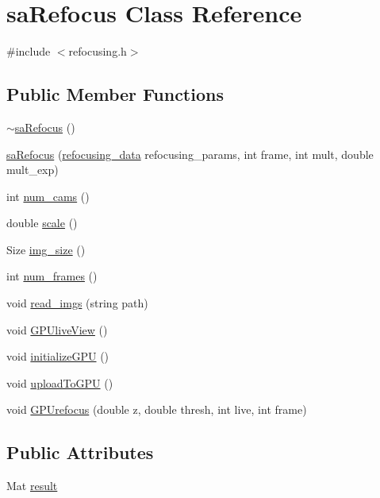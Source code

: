 \hypertarget{classsaRefocus}{\section{sa\-Refocus Class Reference}
\label{d7/d89/classsaRefocus}
}


{\ttfamily \#include $<$refocusing.\-h$>$}

\subsection*{Public Member Functions}
\begin{DoxyCompactItemize}
\item 
\hyperlink{classsaRefocus_a26ed5105f23d8a55aad8fa9a0d40730d}{$\sim$sa\-Refocus} ()
\item 
\hyperlink{classsaRefocus_a1a0ef5c34008567ce8fd5934ca66c361}{sa\-Refocus} (\hyperlink{structrefocusing__data}{refocusing\-\_\-data} refocusing\-\_\-params, int frame, int mult, double mult\-\_\-exp)
\item 
int \hyperlink{classsaRefocus_ad2fb90e82e73e5432ea36f77c4d92c63}{num\-\_\-cams} ()
\item 
double \hyperlink{classsaRefocus_acac3d21a9b434f2176c8d438ed811659}{scale} ()
\item 
Size \hyperlink{classsaRefocus_ac0256a7f546a631ae85ce90b90a2f8d9}{img\-\_\-size} ()
\item 
int \hyperlink{classsaRefocus_aea6a585af06af58407aedca16a85dda3}{num\-\_\-frames} ()
\item 
void \hyperlink{classsaRefocus_a3d75da5d4cf776ea324413f9f138ef70}{read\-\_\-imgs} (string path)
\item 
void \hyperlink{classsaRefocus_ab0d935f4b3a4201c33bf51e39e14a128}{G\-P\-Ulive\-View} ()
\item 
void \hyperlink{classsaRefocus_a2a17871cc22d0b1aed028ad6052f20b4}{initialize\-G\-P\-U} ()
\item 
void \hyperlink{classsaRefocus_a5968ccfa0a4f5d606666321ea68198e2}{upload\-To\-G\-P\-U} ()
\item 
void \hyperlink{classsaRefocus_a2aa40c035a83b39062cd0421eb200512}{G\-P\-Urefocus} (double z, double thresh, int live, int frame)
\end{DoxyCompactItemize}
\subsection*{Public Attributes}
\begin{DoxyCompactItemize}
\item 
Mat \hyperlink{classsaRefocus_a4ad8d70d80a2c9dd5c62de027708c6c4}{result}
\end{DoxyCompactItemize}


